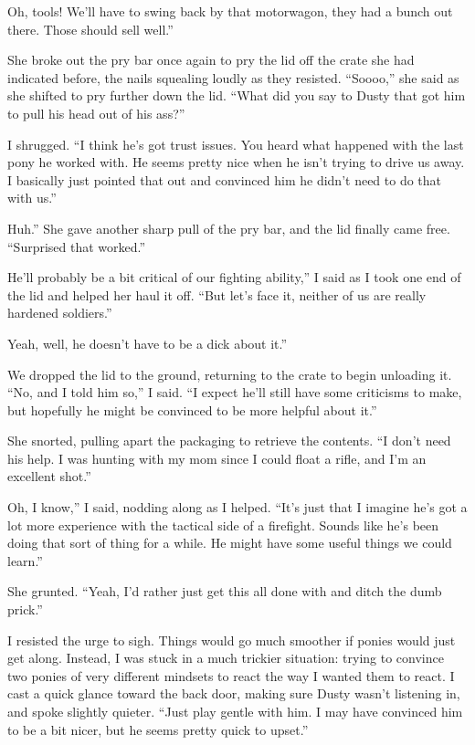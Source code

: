 \leavevmode{}Oh, tools! We’ll have to swing back by that motorwagon, they had a bunch out there. Those should sell well.”

She broke out the pry bar once again to pry the lid off the crate she had indicated before, the nails squealing loudly as they resisted. “Soooo,” she said as she shifted to pry further down the lid. “What did you say to Dusty that got him to pull his head out of his ass?”

I shrugged. “I think he’s got trust issues. You heard what happened with the last pony he worked with. He seems pretty nice when he isn’t trying to drive us away. I basically just pointed that out and convinced him he didn’t need to do that with us.”

\leavevmode{}Huh.” She gave another sharp pull of the pry bar, and the lid finally came free. “Surprised that worked.”

\leavevmode{}He’ll probably be a bit critical of our fighting ability,” I said as I took one end of the lid and helped her haul it off. “But let’s face it, neither of us are really hardened soldiers.”

\leavevmode{}Yeah, well, he doesn’t have to be a dick about it.”

We dropped the lid to the ground, returning to the crate to begin unloading it. “No, and I told him so,” I said. “I expect he’ll still have some criticisms to make, but hopefully he might be convinced to be more helpful about it.”

She snorted, pulling apart the packaging to retrieve the contents. “I don’t need his help. I was hunting with my mom since I could float a rifle, and I’m an excellent shot.”

\leavevmode{}Oh, I know,” I said, nodding along as I helped. “It’s just that I imagine he’s got a lot more experience with the tactical side of a firefight. Sounds like he’s been doing that sort of thing for a while. He might have some useful things we could learn.”

She grunted. “Yeah, I’d rather just get this all done with and ditch the dumb prick.”

I resisted the urge to sigh. Things would go much smoother if ponies would just get along. Instead, I was stuck in a much trickier situation: trying to convince two ponies of very different mindsets to react the way I wanted them to react. I cast a quick glance toward the back door, making sure Dusty wasn’t listening in, and spoke slightly quieter. “Just play gentle with him. I may have convinced him to be a bit nicer, but he seems pretty quick to upset.”

